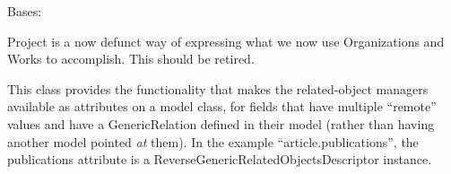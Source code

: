 \documentclass[letterpaper,10pt,english]{sphinxmanual}
\begin{document}

\begin{fulllineitems}
\label{generated/apps.profiles.models:apps.profiles.models.Project}
Bases: {\hyperref[generated/apps.profiles.models:apps.profiles.models.BaseModel]{}}

Project is a now defunct way of expressing what we now use Organizations
and Works to accomplish.  This should be retired.


\begin{fulllineitems}
\label{generated/apps.profiles.models:apps.profiles.models.Project.unit_permissions}
This class provides the functionality that makes the related-object
managers available as attributes on a model class, for fields that have
multiple ``remote'' values and have a GenericRelation defined in their model
(rather than having another model pointed \emph{at} them). In the example
``article.publications'', the publications attribute is a
ReverseGenericRelatedObjectsDescriptor instance.

\end{fulllineitems}


\end{fulllineitems}


\end{document}
